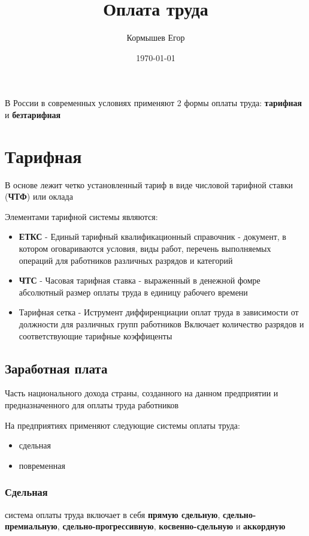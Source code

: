 \documentclass[11pt]{article}
\author{Кормышев Егор}
\date{\today}
\title{Оплата труда}
\begin{document}
\maketitle
\tableofcontents

В России в современных условиях применяют 2 формы оплаты труда: \textbf{тарифная} и \textbf{безтарифная}

\section{Тарифная}
\label{sec:org390e646}

В основе лежит четко установленный тариф в виде числовой тарифной ставки (\textbf{ЧТФ}) или оклада

Элементами тарифной системы являются:

\begin{itemize}
\item \textbf{ЕТКС} - Единый тарифный квалификационный справочник - документ, в котором оговариваются условия, виды работ, перечень выполняемых операций для работников различных разрядов и категорий
\item \textbf{ЧТС} - Часовая тарифная ставка - выраженный в денежной фомре абсолютный размер оплаты труда в единицу рабочего времени
\item Тарифная сетка - Иструмент диффиренциации оплат труда в зависимости от должности для различных групп работников \newline Включает количество разрядов и соответствующие тарифные коэффиценты
\end{itemize}

\subsection{Заработная плата}
\label{sec:org0aaa3cf}

Часть национального дохода страны, созданного на данном предприятии и предназначенного для оплаты труда работников

На предприятиях применяют следующие системы оплаты труда:

\begin{itemize}
\item сдельная
\item повременная
\end{itemize}

\subsubsection{Сдельная}
\label{sec:org18373d9}
система оплаты труда включает в себя \textbf{прямую сдельную}, \textbf{сдельно-премиальную}, \textbf{сдельно-прогрессивную}, \textbf{косвенно-сдельную} и \textbf{аккордную}
\end{document}
